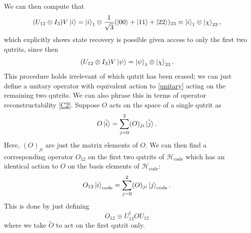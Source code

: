 \documentclass[12pt,a4paper]{report}
\numberwithin{equation}{section}
\newcommand{\Hcode}{\mathcal{H}_{\text{code}}}
\theoremstyle{definition}
\theoremstyle{theorem}
\theoremstyle{theorem}
\theoremstyle{example}
\theoremstyle{definition}
\begin{document}
We can then compute that
\begin{equation}
	(U_{12}\otimes I_{3})V\ket{{i}}=\ket{i}_{1}\otimes\frac{1}{\sqrt{3}}(\ket{{00}}+\ket{{11}}+\ket{{22}})_{23}\equiv\ket{{i}}_{1}\otimes\ket{\chi}_{23},
\end{equation}
which explicitly shows state recovery is possible given access to only the first two qutrits, since then
\begin{equation}\label{staterec}
	(U_{12}\otimes I_{3})V\ket{{\psi}}=\ket{{\psi}}_{1}\otimes\ket{\chi}_{23}.
\end{equation}
This procedure holds irrelevant of which qutrit has been erased; we can just define a unitary operator with equivalent action to \ref{unitary} acting on the remaining two qutrits. We can also phrase this in terms of operator reconstructability \ref{C2}. Suppose ${O}$ acts on the space of a single qutrit as
\begin{equation}
	{O}\ket{\tilde{i}}=\sum_{j=0}^{2}(O)_{ji}\ket{\tilde{j}}.
\end{equation}
Here, $(O)_{ji}$ are just the matrix elements of $O$. We can then find a corresponding operator $O_{12}$ on the first two qutrits of $\Hcode$ which has an identical action to $O$ on the basis elements of $\Hcode$:
\begin{equation}
	O_{12}\ket{i}_{\text{code}}=\sum_{j=0}^{2}(O)_{ji}\ket{j}_{\text{code}}.
\end{equation}
This is done by just defining
\begin{equation}
	O_{12}\equiv U_{12}^{\dagger}OU_{12}
\end{equation}
where we take $\tilde{O}$ to act on the first qutrit only.
\end{document}
